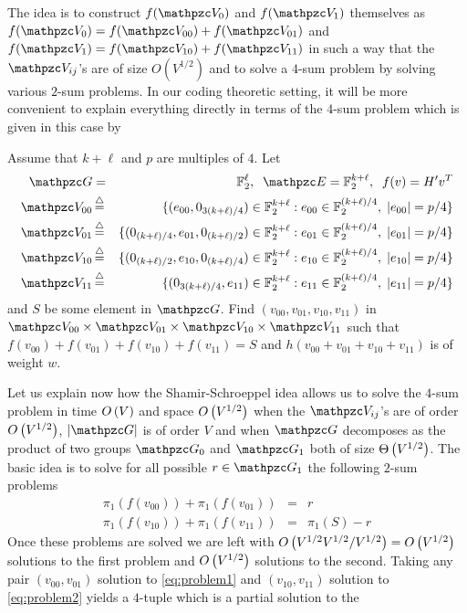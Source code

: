 The idea is to construct $f(\zV_0)$ and $f(\zV_1)$ themselves as 
$f(\zV_0)=f(\zV_{00})+f(\zV_{01})$ and 
$f(\zV_1)=f(\zV_{10}) + f(\zV_{11})$ in such a way that  the $\zV_{ij}$'s are of size $O(V^{1/2})$
and to solve a $4$-sum problem by solving various $2$-sum problems. In our coding theoretic setting, it will be more convenient to explain everything directly in terms
of the $4$-sum problem which is given in this case by
\begin{problem}\label{pb:SS}
Assume that $k+\ell$  and $p$ are multiples of $4$. 
Let 
\begin{eqnarray*}
\zG & = &\Ft^\ell, \;\;\zE  =  \Ft^{k+\ell}, \;\;f(v)  =  H'{v}^T\\
\zV_{00} &\eqdef &\{(e_{00},0_{3(k+\ell)/4})\in \Ft^{k+\ell} : e_{00 }\in \Ft^{(k+\ell)/4},\; |e_{00}|=p/4\} \\
\zV_{01} &\eqdef &\{(0_{(k+\ell)/4},e_{01},0_{(k+\ell)/2})\in \Ft^{k+\ell} : e_{01 }\in \Ft^{(k+\ell)/4},\; |e_{01}|=p/4\} \\
\zV_{10} &\eqdef &\{(0_{(k+\ell)/2},e_{10},0_{(k+\ell)/4})\in \Ft^{k+\ell} : e_{10 }\in \Ft^{(k+\ell)/4},\; |e_{10}|=p/4\} \\
\zV_{11} &\eqdef &\{(0_{3(k+\ell)/4},e_{11})\in \Ft^{k+\ell} : e_{11}\in \Ft^{(k+\ell)/4},\; |e_{11}|=p/4\} 
\end{eqnarray*}
and $S$ be some element in $\zG$.
Find $(v_{00},v_{01},v_{10},v_{11})$ in $\zV_{00}\times \zV_{01} \times \zV_{10} \times \zV_{11}$ such 
that $f(v_{00})+f(v_{01})+f(v_{10})+f(v_{11})=S$ and $h(v_{00}+v_{01}+v_{10}+v_{11})$ is of weight $w$.
\end{problem}
Let us explain now how the Shamir-Schroeppel idea allows us to solve the $4$-sum problem in time $O\left( V \right)$ and space $O\left( V^{1/2} \right)$ when 
the $\zV_{ij}$'s are of order $O\left( V^{1/2} \right)$, 
$|\zG|$ is of order $V$ and when $\zG$ decomposes as the product of two groups $\zG_0$ and $\zG_1$ both of size $\Theta\left( V^{1/2} \right)$.
The basic idea is  to solve for all possible $r \in \zG_1$ the following $2$-sum problems 
\begin{eqnarray}
\pi_1(f(v_{00})) +\pi_1(f(v_{01})) & = & r\label{eq:problem1}\\
\pi_1(f(v_{10}))  +\pi_1(f(v_{11})) & = & \pi_1(S)-r \label{eq:problem2}
\end{eqnarray}
Once these problems are solved we are left with  $O\left( V^{1/2} V^{1/2}/V^{1/2} \right)=O\left( V^{1/2} \right) $ solutions to the first problem and $O\left( V^{1/2} \right)$ solutions to the second.
Taking any pair $(v_{00},v_{01})$ solution to \eqref{eq:problem1}  and $(v_{10},v_{11})$ solution to \eqref{eq:problem2} yields a $4$-tuple which is a partial solution to the
